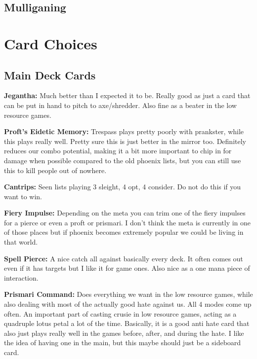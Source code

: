 \documentclass[12pt]{article}
\begin{document}
\subsection{Mulliganing}

\clearpage
\section{Card Choices}
\subsection{Main Deck Cards}
\label{sec:mainchoices}
\textbf{Jegantha:}
Much better than I expected it to be. Really good as just a card that can be put in hand to pitch to axe/shredder. Also fine as a beater in the low resource games.

\vspace{0.4em}
\noindent \textbf{Proft's Eidetic Memory:}
Trespass plays pretty poorly with prankster, while this plays really well. Pretty sure this is just better in the mirror too. Definitely reduces our combo potential, making it a bit more important to chip in for damage when possible compared to the old phoenix lists, but you can still use this to kill people out of nowhere.

\vspace{0.4em}
\noindent \textbf{Cantrips:}
Seen lists playing 3 sleight, 4 opt, 4 consider. Do not do this if you want to win.

\vspace{0.4em}
\noindent \textbf{Fiery Impulse:}
Depending on the meta you can trim one of the fiery impulses for a pierce or even a proft or prismari. I don't think the meta is currently in one of those places but if phoenix becomes extremely popular we could be living in that world.

\vspace{0.4em}
\noindent \textbf{Spell Pierce:}
A nice catch all against basically every deck. It often comes out even if it has targets but I like it for game ones. Also nice as a one mana piece of interaction.

\vspace{0.4em}
\noindent \textbf{Prismari Command:}
Does everything we want in the low resource games, while also dealing with most of the actually good hate against us. All 4 modes come up often. An important part of casting crusie in low resource games, acting as a quadruple lotus petal a lot of the time. Basically, it is a good anti hate card that also just plays really well in the games before, after, and during the hate. I like the idea of having one in the main, but this maybe should just be a sideboard card.
\end{document}
